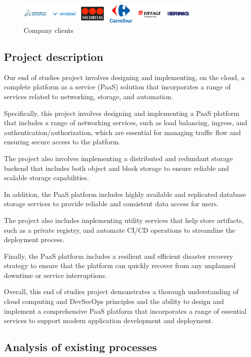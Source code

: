 \begin{figure}[!ht]\centering
\includegraphics[width=0.8\textwidth,angle=00]{assets/fc.png}
\caption{Company clients}
\end{figure}


\subsection{Project description }

Our end of studies project involves designing and implementing, on the cloud, a complete platform as a service (PaaS) solution that incorporates a range of services related to networking, storage, and automation. 

Specifically, this project involves designing and implementing a PaaS platform that includes a range of networking services, such as load balancing, ingress, and authentication/authorization, which are essential for managing traffic flow and ensuring secure access to the platform. 

The project also involves implementing a distributed and redundant storage backend that includes both object and block storage to ensure reliable and scalable storage capabilities. 

In addition, the PaaS platform includes highly available and replicated database storage services to provide reliable and consistent data access for users. 

The project also includes implementing utility services that help store artifacts, such as a private registry, and automate CI/CD operations to streamline the deployment process. 


Finally, the PaaS platform includes a resilient and efficient disaster recovery strategy to ensure that the platform can quickly recover from any unplanned downtime or service interruptions. 

Overall, this end of studies project demonstrates a thorough understanding of cloud computing and DevSecOps principles and the ability to design and implement a comprehensive PaaS platform that incorporates a range of essential services to support modern application development and deployment. 

\subsection{Analysis of existing processes }


